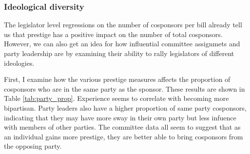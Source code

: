 \documentclass{article}
\begin{document}
  \subsubsection{Ideological diversity}
  \label{result:ideology}
  The legislator level regressions on the number of cosponsors per bill already tell us that prestige has a positive impact on the number of total cosponsors. However, we can also get an idea for how influential committee assignmets and party leadership are by examining their ability to rally legislators of different ideologies.
  
  First, I examine how the various prestige measures affects the proportion of cosponsors who are in the same party as the sponsor. These results are shown in Table \ref{tab:party_prop}. Experience seems to correlate with becoming more bipartisan. Party leaders also have a higher proportion of same party cosponsors, indicating that they may have more sway in their own party but less infuence with members of other parties. The committee data all seem to suggest that as an individual gains more prestige, they are better able to bring cosponsors from the opposing party. 
\end{document}
